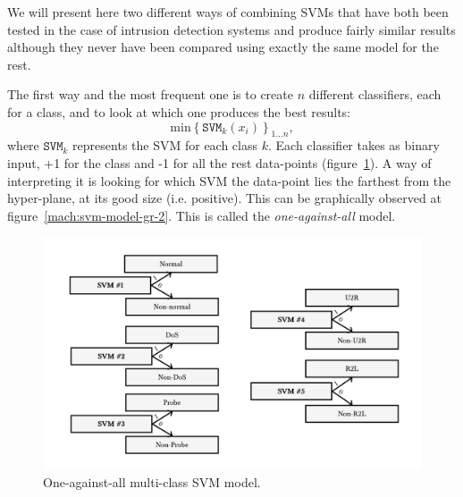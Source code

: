 We will present here two different ways of combining SVMs that have both been tested in the case of intrusion detection systems \cite{Kuang2014ADetection,SumaiyaThaseen2017IntrusionSVM} and produce fairly similar results although they never have been compared using exactly the same model for the rest.

The first way and the most frequent one is to create $n$ different classifiers, each for a class, and to look at which one produces the best results:
\begin{equation}
    \mathrm{min}\left\{ \mathtt{SVM}_k (x_i)   \right\}_{1 \ldots n},
\end{equation}
where $\mathtt{SVM}_k$ represents the SVM for each class $k$. Each classifier takes as binary input, +1 for the class and -1 for all the rest data-points  (figure~\ref{mach:svm-model-1}). A way of interpreting it is looking for which SVM the data-point lies the farthest from the hyper-plane, at its good size (i.e. positive). This can be graphically observed at figure~\ref{mach:svm-model-gr-2}. This is called the \emph{one-against-all} model.

\begin{figure}[ht!]
    \centering
    \includegraphics[width=.85\textwidth]{parts/chap-2/img-2/model-svm-1.png}
    \caption{One-against-all multi-class SVM model.} 
    \label{mach:svm-model-1}
\end{figure}

